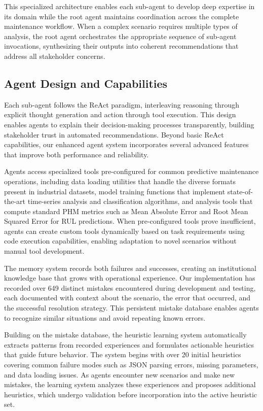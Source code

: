 \documentclass[conference]{IEEEtran}
\begin{document}
This specialized architecture enables each sub-agent to develop deep expertise in its domain while the root agent maintains coordination across the complete maintenance workflow. When a complex scenario requires multiple types of analysis, the root agent orchestrates the appropriate sequence of sub-agent invocations, synthesizing their outputs into coherent recommendations that address all stakeholder concerns.

\subsection{Agent Design and Capabilities}

Each sub-agent follows the ReAct paradigm, interleaving reasoning through explicit thought generation and action through tool execution. This design enables agents to explain their decision-making processes transparently, building stakeholder trust in automated recommendations. Beyond basic ReAct capabilities, our enhanced agent system incorporates several advanced features that improve both performance and reliability.

Agents access specialized tools pre-configured for common predictive maintenance operations, including data loading utilities that handle the diverse formats present in industrial datasets, model training functions that implement state-of-the-art time-series analysis and classification algorithms, and analysis tools that compute standard PHM metrics such as Mean Absolute Error and Root Mean Squared Error for RUL predictions. When pre-configured tools prove insufficient, agents can create custom tools dynamically based on task requirements using code execution capabilities, enabling adaptation to novel scenarios without manual tool development.

The memory system records both failures and successes, creating an institutional knowledge base that grows with operational experience. Our implementation has recorded over 649 distinct mistakes encountered during development and testing, each documented with context about the scenario, the error that occurred, and the successful resolution strategy. This persistent mistake database enables agents to recognize similar situations and avoid repeating known errors.

Building on the mistake database, the heuristic learning system automatically extracts patterns from recorded experiences and formulates actionable heuristics that guide future behavior. The system begins with over 20 initial heuristics covering common failure modes such as JSON parsing errors, missing parameters, and data loading issues. As agents encounter new scenarios and make new mistakes, the learning system analyzes these experiences and proposes additional heuristics, which undergo validation before incorporation into the active heuristic set.
\end{document}

